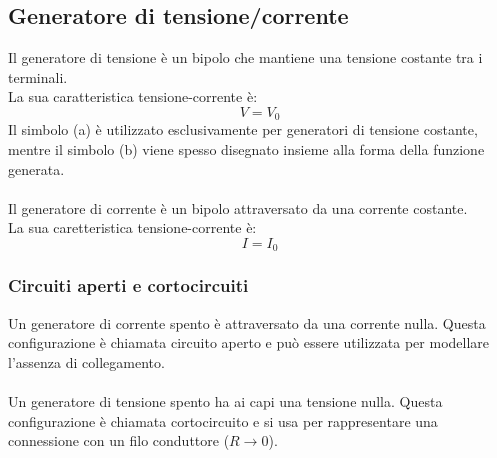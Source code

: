 \documentclass{article}
\begin{document}
\subsection{Generatore di tensione/corrente}
Il generatore di tensione è un bipolo che mantiene una tensione costante tra i terminali.\\
La sua caratteristica tensione-corrente è:
$$ V=V_0 $$
Il simbolo (a) è utilizzato esclusivamente per generatori di tensione costante, mentre il simbolo (b) viene spesso disegnato insieme alla forma della funzione generata.\\\\
Il generatore di corrente è un bipolo attraversato da una corrente costante.\\
La sua caretteristica tensione-corrente è:
$$ I=I_0 $$

\subsubsection{Circuiti aperti e cortocircuiti}
Un generatore di corrente spento è attraversato da una corrente nulla. Questa configurazione è chiamata circuito aperto e può essere utilizzata per modellare l'assenza di collegamento.\\\\
Un generatore di tensione spento ha ai capi una tensione nulla. Questa configurazione è chiamata cortocircuito e si usa per rappresentare una connessione con un filo conduttore ($R\rightarrow0$).
\end{document}
